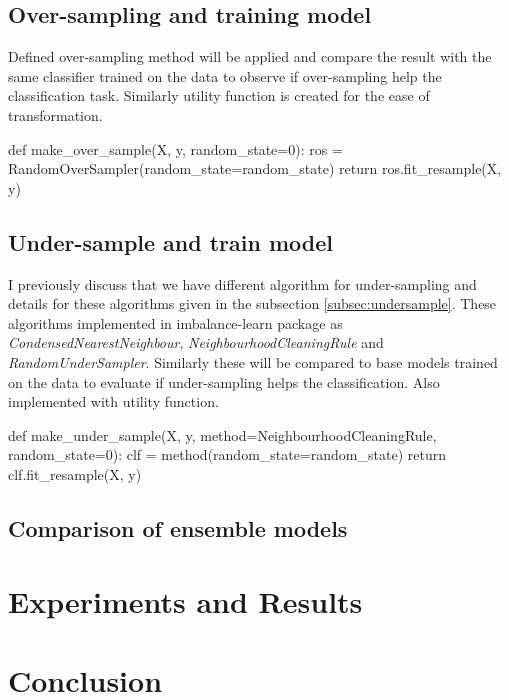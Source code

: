 \documentclass[12pt]{article}
\begin{document}
\subsection{Over-sampling and training model} \label{subsec:oversample}
Defined over-sampling method will be applied and compare the result with the same classifier trained on the data to observe if over-sampling help the classification task. Similarly utility function is created for the ease of transformation.

\begin{python}
    def make_over_sample(X, y, random_state=0):
        ros = RandomOverSampler(random_state=random_state)
        return ros.fit_resample(X, y)
\end{python}

\subsection{Under-sample and train model} \label{subsec:compareundersample}

I previously discuss that we have different algorithm for under-sampling and details for these algorithms given in the subsection \ref{subsec:undersample}. These algorithms implemented in imbalance-learn package as \textit{CondensedNearestNeighbour}, \textit{NeighbourhoodCleaningRule} and \textit{RandomUnderSampler}. Similarly these will be compared to base models trained on the data to evaluate if under-sampling helps the classification. Also implemented with utility function.

\begin{python}
    def make_under_sample(X, y, method=NeighbourhoodCleaningRule, random_state=0):
        clf = method(random_state=random_state)
        return clf.fit_resample(X, y)
\end{python}

\subsection{Comparison of ensemble models} \label{subsec:ensemblecomparison}


\section{Experiments and Results} \label{sec:experiment}

\section{Conclusion} \label{sec:conclution}

\printbibliography
\end{document}
